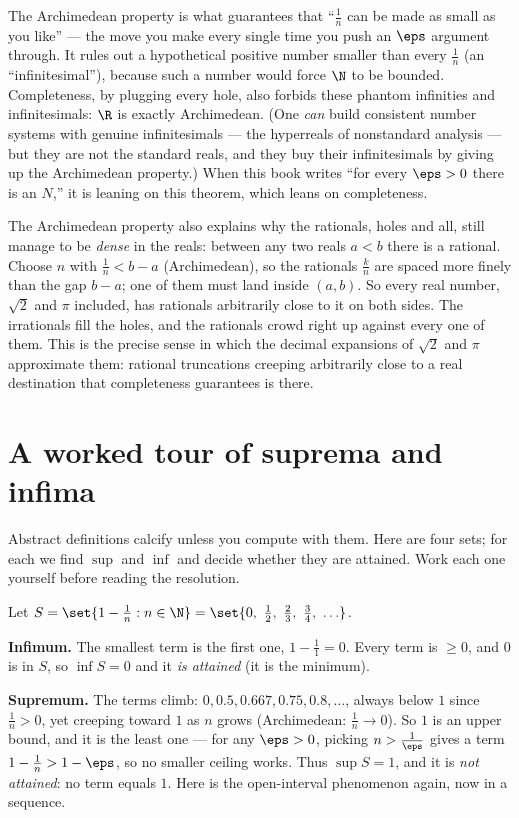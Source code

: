 \begin{happeningbox}
The Archimedean property is what guarantees that ``$\frac1n$ can be made as small as you
like'' --- the move you make every single time you push an $\eps$ argument through. It rules
out a hypothetical positive number smaller than every $\frac1n$ (an ``infinitesimal''),
because such a number would force $\N$ to be bounded. Completeness, by plugging every hole,
also forbids these phantom infinities and infinitesimals: $\R$ is exactly Archimedean. (One
\emph{can} build consistent number systems with genuine infinitesimals --- the hyperreals
of nonstandard analysis --- but they are not the standard reals, and they buy their
infinitesimals by giving up the Archimedean property.) When this book writes ``for every
$\eps>0$ there is an $N$,'' it is leaning on this theorem, which leans on completeness.
\end{happeningbox}

\begin{connectionbox}
The Archimedean property also explains why the rationals, holes and all, still manage to be
\emph{dense} in the reals: between any two reals $a<b$ there is a rational. Choose $n$ with
$\frac1n < b-a$ (Archimedean), so the rationals $\frac{k}{n}$ are spaced more finely than
the gap $b-a$; one of them must land inside $(a,b)$. So every real number, $\sqrt2$ and
$\pi$ included, has rationals arbitrarily close to it on both sides. The irrationals fill
the holes, and the rationals crowd right up against every one of them. This is the precise
sense in which the decimal expansions of $\sqrt2$ and $\pi$ approximate them: rational
truncations creeping arbitrarily close to a real destination that completeness guarantees
is there.
\end{connectionbox}

\section{A worked tour of suprema and infima}
\label{ch41:worked}

Abstract definitions calcify unless you compute with them. Here are four sets; for each we
find $\sup$ and $\inf$ and decide whether they are attained. Work each one yourself before
reading the resolution.

\begin{example}
\label{ch41:ex1}
Let $S = \set{1 - \tfrac1n : n\in\N} = \set{0,\ \tfrac12,\ \tfrac23,\ \tfrac34,\ \ldots}$.

\textbf{Infimum.} The smallest term is the first one, $1-\frac11 = 0$. Every term is
$\ge 0$, and $0$ is in $S$, so $\inf S = 0$ and it \emph{is attained} (it is the minimum).

\textbf{Supremum.} The terms climb: $0,0.5,0.667,0.75,0.8,\ldots$, always below $1$ since
$\frac1n>0$, yet creeping toward $1$ as $n$ grows (Archimedean: $\frac1n\to0$). So $1$ is
an upper bound, and it is the least one --- for any $\eps>0$, picking $n>\frac1\eps$ gives
a term $1-\frac1n > 1-\eps$, so no smaller ceiling works. Thus $\sup S = 1$, and it is
\emph{not attained}: no term equals $1$. Here is the open-interval phenomenon again, now in
a sequence.
\end{example}

